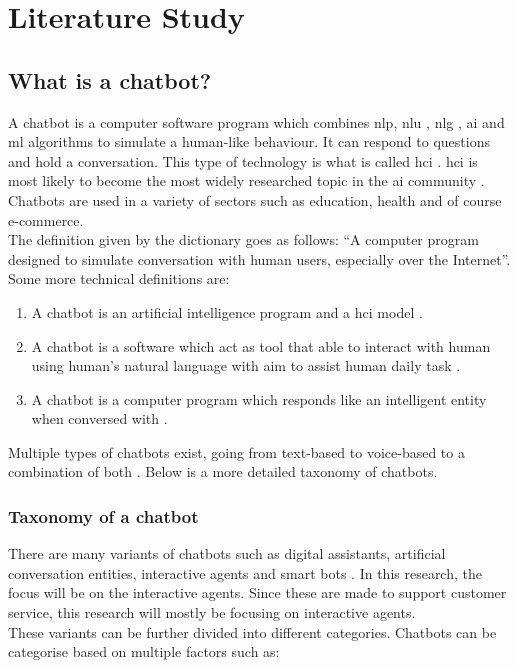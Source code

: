 \mainmatter
\pagestyle{headings}

\chapter{Literature Study}
\label{ch:literature-study}

\section{What is a chatbot?}
A chatbot is a computer software program which combines \acrfull{nlp}, \acrfull{nlu} , \acrfull{nlg} \citep{Adamopoulou2020}, \acrfull{ai} and \acrfull{ml} algorithms to simulate a human-like behaviour. It can respond to questions and hold a conversation. This type of technology is what is called \acrfull{hci} \citep{Adamopoulou2020}.  \acrshort{hci} is most likely to become the most widely researched topic in the \acrshort{ai} community \citep{Bansal2018}. Chatbots are used in a variety of sectors such as education, health and of course e-commerce.\\
\break
The definition given by the dictionary goes as follows: “A computer program designed to simulate conversation with human users, especially over the Internet”\citep{Lexico2022}. Some more technical definitions are:
\begin{enumerate}
	\item A chatbot is an artificial intelligence program and a \acrfull{hci} model \citep{Bansal2018}.
	\item A chatbot is a software which act as tool that able to interact with human using human’s natural language with aim to assist human daily task \citep{Muizzah2021}.
	\item A chatbot  is  a  computer  program  which  responds  like  an  intelligent  entity when  conversed  with \citep{Khanna2015}.
\end{enumerate}
\break
Multiple types of chatbots exist, going from text-based to voice-based to a combination of both \citep{Radziwil2021}. Below is a more detailed taxonomy of chatbots.\\

\subsection{Taxonomy of a chatbot}
There are many variants of chatbots such as digital assistants, artificial conversation entities, interactive agents and smart bots \citep{Adamopoulou2020}. In this research, the focus will be on the interactive agents. Since these are made to support customer service, this research will mostly be focusing on interactive agents.\\
\break
These variants can be further divided into different categories. Chatbots can be categorise based on multiple factors such as:\\

